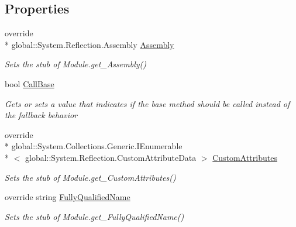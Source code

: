 \subsection*{Properties}
\begin{DoxyCompactItemize}
\item 
override \\*
global\-::\-System.\-Reflection.\-Assembly \hyperlink{class_system_1_1_reflection_1_1_fakes_1_1_stub_module_a8c184f7a6b5f5715a03cf5bb59a2ef31}{Assembly}
\begin{DoxyCompactList}\small\item\em Sets the stub of Module.\-get\-\_\-\-Assembly()\end{DoxyCompactList}\item 
bool \hyperlink{class_system_1_1_reflection_1_1_fakes_1_1_stub_module_a676f0b049fb2afe81c1bc301c7d2157e}{Call\-Base}
\begin{DoxyCompactList}\small\item\em Gets or sets a value that indicates if the base method should be called instead of the fallback behavior\end{DoxyCompactList}\item 
override \\*
global\-::\-System.\-Collections.\-Generic.\-I\-Enumerable\\*
$<$ global\-::\-System.\-Reflection.\-Custom\-Attribute\-Data $>$ \hyperlink{class_system_1_1_reflection_1_1_fakes_1_1_stub_module_ad27f99716b7d464956b3f55cb8fc030c}{Custom\-Attributes}
\begin{DoxyCompactList}\small\item\em Sets the stub of Module.\-get\-\_\-\-Custom\-Attributes()\end{DoxyCompactList}\item 
override string \hyperlink{class_system_1_1_reflection_1_1_fakes_1_1_stub_module_a3437e6a1658c7691698b6602f3e9ee95}{Fully\-Qualified\-Name}
\begin{DoxyCompactList}\small\item\em Sets the stub of Module.\-get\-\_\-\-Fully\-Qualified\-Name()\end{DoxyCompactList}\item 

\end{DoxyCompactItemize}
